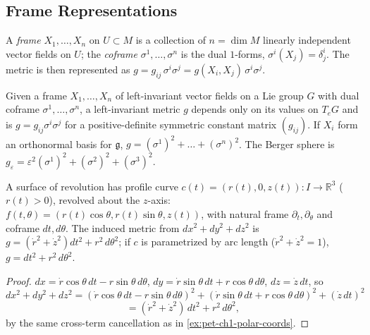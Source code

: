 \subsection{Frame Representations}

\begin{definition}
  \label{def:pet-ch1-frame-metric}
  \leanok
  A \emph{frame} $X_1,\dots,X_n$ on $U\subset M$ is a collection of $n=\dim M$
  linearly independent vector fields on $U$; the \emph{coframe} $\sigma^1,\dots,
  \sigma^n$ is the dual $1$-forms, $\sigma^i(X_j)=\delta^i_j$. The metric is then
  represented as $g=g_{ij}\,\sigma^i\sigma^j=g(X_i,X_j)\,\sigma^i\sigma^j$.
\end{definition}

\begin{example}
  \label{ex:pet-ch1-left-invariant-coframe}
  \leanok
  Given a frame $X_1,\dots,X_n$ of left-invariant vector fields on a Lie group
  $G$ with dual coframe $\sigma^1,\dots,\sigma^n$, a left-invariant metric $g$
  depends only on its values on $T_eG$ and is $g=g_{ij}\sigma^i\sigma^j$ for a
  positive-definite symmetric constant matrix $(g_{ij})$. If $X_i$ form an
  orthonormal basis for $\mathfrak{g}$, $g=(\sigma^1)^2+\dots+(\sigma^n)^2$. The
  Berger sphere is $g_\varepsilon=\varepsilon^2(\sigma^1)^2+(\sigma^2)^2+(\sigma^3)^2$.
\end{example}

\begin{example}
  \label{ex:pet-ch1-surface-of-revolution}
  \leanok
  A surface of revolution has profile curve $c(t)=(r(t),0,z(t)):I\to\mathbb{R}^3$
  ($r(t)>0$), revolved about the $z$-axis:
  $f(t,\theta)=(r(t)\cos\theta,r(t)\sin\theta,z(t))$, with natural frame
  $\partial_t,\partial_\theta$ and coframe $dt,d\theta$. The induced metric from
  $dx^2+dy^2+dz^2$ is $g=(\dot r^2+\dot z^2)dt^2+r^2\,d\theta^2$; if $c$ is
  parametrized by arc length ($\dot r^2+\dot z^2=1$), $g=dt^2+r^2\,d\theta^2$.
\end{example}
\begin{proof}
  \leanok
  $dx=\dot r\cos\theta\,dt-r\sin\theta\,d\theta$,
  $dy=\dot r\sin\theta\,dt+r\cos\theta\,d\theta$, $dz=\dot z\,dt$, so
  \[
    dx^2+dy^2+dz^2
    =(\dot r\cos\theta\,dt-r\sin\theta\,d\theta)^2+(\dot r\sin\theta\,dt+r\cos\theta\,d\theta)^2+(\dot z\,dt)^2
  \]
  \[
    =(\dot r^2+\dot z^2)\,dt^2+r^2\,d\theta^2,
  \]
  by the same cross-term cancellation as in \cref{ex:pet-ch1-polar-coords}.
\end{proof}

